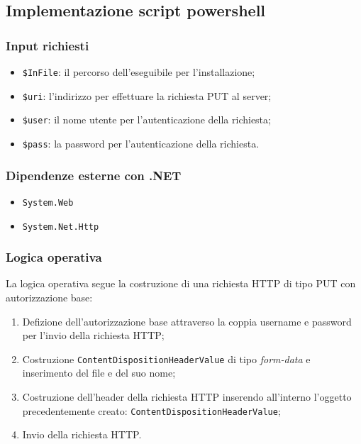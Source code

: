 \documentclass[../RelazioneFinale.tex]{subfiles}
\begin{document}
		\subsection{Implementazione script powershell}
			\subsubsection*{Input richiesti}
			\begin{itemize}
				\item \verb|$InFile|: il percorso dell'eseguibile per l'installazione;
				\item \verb|$uri|: l'indirizzo per effettuare la richiesta PUT al server;
				\item \verb|$user|: il nome utente per l'autenticazione della richiesta;
				\item \verb|$pass|: la password per l'autenticazione della richiesta.
			\end{itemize}
			
			\subsubsection*{Dipendenze esterne con .NET}
			\begin{itemize}
				\item \verb|System.Web|
				\item \verb|System.Net.Http|
			\end{itemize}
			
			\subsubsection*{Logica operativa}
				La logica operativa segue la costruzione di una richiesta HTTP di tipo PUT con autorizzazione base:
				\begin{enumerate}
					\item Defizione dell'autorizzazione base attraverso la coppia username e password per l'invio della richiesta HTTP;
					\item Costruzione \verb|ContentDispositionHeaderValue| di tipo \emph{form-data} e inserimento del file e del suo nome;
					\item Costruzione dell'header della richiesta HTTP inserendo all'interno l'oggetto precedentemente creato: \verb|ContentDispositionHeaderValue|;
					\item Invio della richiesta HTTP.
				\end{enumerate}
			
			
	
\end{document}
